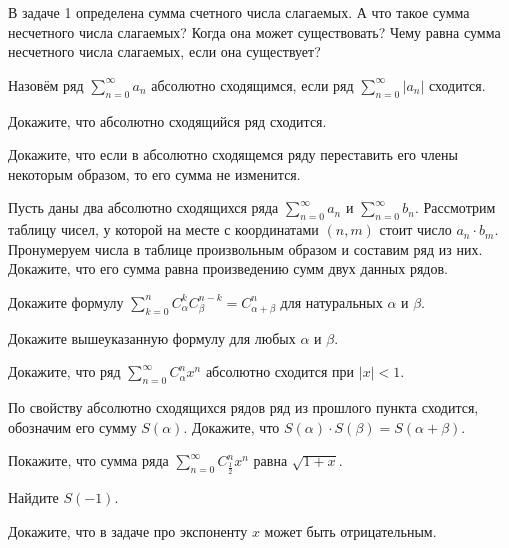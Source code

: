 \documentclass[a4paper, 12pt]{article}
\newcommand{\0}[1]{\overline{#1}}
\begin{document}
 В задаче 1 определена сумма счетного числа слагаемых.
А что такое сумма несчетного числа слагаемых? Когда она может существовать?
Чему равна сумма несчетного числа слагаемых, если она существует?

 Назовём ряд $\sum\limits_{n=0}^{\infty}a_n$ абсолютно сходящимся, если ряд $\sum\limits_{n=0}^{\infty}|a_n|$ сходится.

 Докажите, что абсолютно сходящийся ряд сходится.

 Докажите, что если в абсолютно сходящемся ряду переставить его члены некоторым образом, то его сумма не изменится.

 Пусть даны два абсолютно сходящихся ряда $\sum\limits_{n=0}^{\infty}a_n$ и $\sum\limits_{n=0}^{\infty}b_n.$ Рассмотрим таблицу чисел, у которой на месте с координатами $(n,m)$ стоит число $a_n\cdot b_m$. Пронумеруем числа в таблице произвольным образом и составим ряд из них. Докажите, что его сумма равна произведению сумм двух данных рядов.

 Докажите формулу $\sum\limits_{k=0}^{n} C_{\alpha}^k C_{\beta}^{n-k} = C_{\alpha+\beta}^n$ для натуральных $\alpha$ и $\beta$.

 Докажите вышеуказанную формулу для любых $\alpha$ и $\beta$.

 Докажите, что ряд $\sum\limits_{n=0}^{\infty} C_{\alpha}^nx^n $ абсолютно сходится при $|x|<1.$

 По свойству абсолютно сходящихся рядов ряд из прошлого пункта сходится, обозначим его сумму $S(\alpha).$ Докажите, что $S(\alpha)\cdot S(\beta)=S(\alpha+\beta).$

 Покажите, что сумма ряда $\sum\limits_{n=0}^{\infty} C_{\frac12}^nx^n $ равна $\sqrt{1+x}$.

 Найдите $S(-1)$.


 Докажите, что в задаче про экспоненту $x$ может быть отрицательным.



\end{document}
